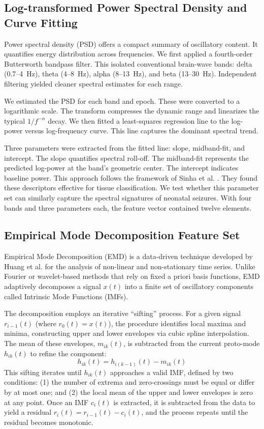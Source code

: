 \documentclass[pdflatex,sn-mathphys-num]{sn-jnl}%
\theoremstyle{thmstyleone}%
\theoremstyle{thmstyletwo}%
\theoremstyle{thmstylethree}%
\begin{document}
\subsection{Log-transformed Power Spectral Density and Curve Fitting}\label{subsec:psd}

Power spectral density (PSD) offers a compact summary of oscillatory content. It quantifies energy distribution across frequencies. We first applied a fourth-order Butterworth bandpass filter. This isolated conventional brain-wave bands: delta (0.7--4~Hz), theta (4--8~Hz), alpha (8--13~Hz), and beta (13--30~Hz). Independent filtering yielded cleaner spectral estimates for each range.

We estimated the PSD for each band and epoch. These were converted to a logarithmic scale. The transform compresses the dynamic range and linearizes the typical $1/f^{-\alpha}$ decay. We then fitted a least-squares regression line to the log-power versus log-frequency curve. This line captures the dominant spectral trend.

Three parameters were extracted from the fitted line: slope, midband-fit, and intercept. The slope quantifies spectral roll-off. The midband-fit represents the predicted log-power at the band's geometric center. The intercept indicates baseline power. This approach follows the framework of Sinha et al. \cite{sinha2016}. They found these descriptors effective for tissue classification. We test whether this parameter set can similarly capture the spectral signatures of neonatal seizures. With four bands and three parameters each, the feature vector contained twelve elements.

\subsection{Empirical Mode Decomposition Feature Set}\label{subsec:emd}

Empirical Mode Decomposition (EMD) is a data-driven technique developed by Huang et al. \cite{huang1998} for the analysis of non-linear and non-stationary time series. Unlike Fourier or wavelet-based methods that rely on fixed a priori basis functions, EMD adaptively decomposes a signal $x(t)$ into a finite set of oscillatory components called Intrinsic Mode Functions (IMFs).

The decomposition employs an iterative ``sifting'' process. For a given signal $r_{i-1}(t)$ (where $r_0(t) = x(t)$), the procedure identifies local maxima and minima, constructing upper and lower envelopes via cubic spline interpolation. The mean of these envelopes, $m_{ik}(t)$, is subtracted from the current proto-mode $h_{ik}(t)$ to refine the component:
\begin{equation}
    h_{ik}(t) = h_{i(k-1)}(t) - m_{ik}(t)
\end{equation}
This sifting iterates until $h_{ik}(t)$ approaches a valid IMF, defined by two conditions: (1) the number of extrema and zero-crossings must be equal or differ by at most one; and (2) the local mean of the upper and lower envelopes is zero at any point. Once an IMF $c_i(t)$ is extracted, it is subtracted from the data to yield a residual $r_i(t) = r_{i-1}(t) - c_i(t)$, and the process repeats until the residual becomes monotonic.
\end{document}
